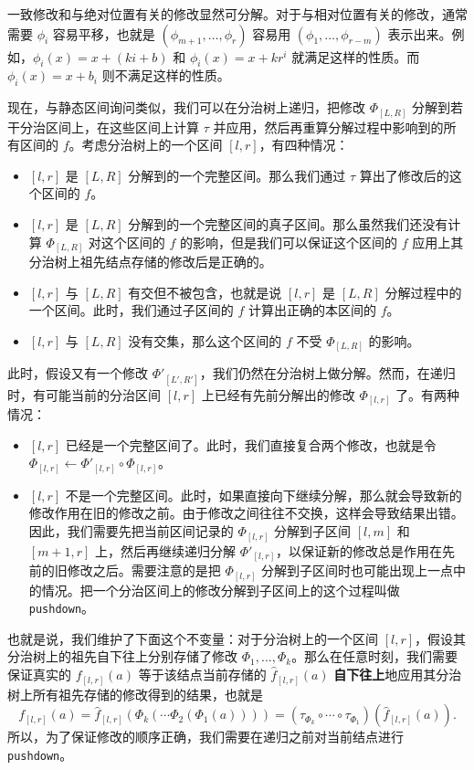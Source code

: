 \begin{example}
    一致修改和与绝对位置有关的修改显然可分解。对于与相对位置有关的修改，通常需要 $\phi_i$ 容易平移，也就是 $(\phi_{m+1},\ldots,\phi_r)$ 容易用 $(\phi_1,\ldots,\phi_{r-m})$ 表示出来。例如，$\phi_i(x)=x+(ki+b)$ 和 $\phi_i(x)=x+kr^i$ 就满足这样的性质。而 $\phi_i(x)=x+b_i$ 则不满足这样的性质。
\end{example}

现在，与静态区间询问类似，我们可以在分治树上递归，把修改 $\Phi_{[L,R]}$ 分解到若干分治区间上，在这些区间上计算 $\tau$ 并应用，然后再重算分解过程中影响到的所有区间的 $f$。考虑分治树上的一个区间 $[l,r]$，有四种情况：
\begin{itemize}
    \item $[l,r]$ 是 $[L,R]$ 分解到的一个完整区间。那么我们通过 $\tau$ 算出了修改后的这个区间的 $f$。
    \item $[l,r]$ 是 $[L,R]$ 分解到的一个完整区间的真子区间。那么虽然我们还没有计算 $\Phi_{[L,R]}$ 对这个区间的 $f$ 的影响，但是我们可以保证这个区间的 $f$ 应用上其分治树上祖先结点存储的修改后是正确的。
    \item $[l,r]$ 与 $[L,R]$ 有交但不被包含，也就是说 $[l,r]$ 是 $[L,R]$ 分解过程中的一个区间。此时，我们通过子区间的 $f$ 计算出正确的本区间的 $f$。
    \item $[l,r]$ 与 $[L,R]$ 没有交集，那么这个区间的 $f$ 不受 $\Phi_{[L,R]}$ 的影响。
\end{itemize}

此时，假设又有一个修改 $\Phi'_{[L',R']}$，我们仍然在分治树上做分解。然而，在递归时，有可能当前的分治区间 $[l,r]$ 上已经有先前分解出的修改 $\Phi_{[l,r]}$ 了。有两种情况：
\begin{itemize}
    \item $[l,r]$ 已经是一个完整区间了。此时，我们直接复合两个修改，也就是令 $\Phi_{[l,r]}\gets \Phi'_{[l,r]}\circ \Phi_{[l,r]}$。
    \item $[l,r]$ 不是一个完整区间。此时，如果直接向下继续分解，那么就会导致新的修改作用在旧的修改之前。由于修改之间往往不交换，这样会导致结果出错。因此，我们需要先把当前区间记录的 $\Phi_{[l,r]}$ 分解到子区间 $[l,m]$ 和 $[m+1,r]$ 上，然后再继续递归分解 $\Phi'_{[l,r]}$，以保证新的修改总是作用在先前的旧修改之后。需要注意的是把 $\Phi_{[l,r]}$ 分解到子区间时也可能出现上一点中的情况。把一个分治区间上的修改分解到子区间上的这个过程叫做 \texttt{pushdown}。
\end{itemize}

也就是说，我们维护了下面这个不变量：对于分治树上的一个区间 $[l,r]$，假设其分治树上的祖先自下往上分别存储了修改 $\Phi_1,\ldots,\Phi_k$。那么在任意时刻，我们需要保证真实的 $f_{[l,r]}(a)$ 等于该结点当前存储的 $\hat f_{[l,r]}(a)$ \textbf{自下往上}地应用其分治树上所有祖先存储的修改得到的结果，也就是
$$
f_{[l,r]}(a)=\hat f_{[l,r]}(\Phi_k(\cdots\Phi_2(\Phi_1(a))))=(\tau_{\Phi_k}\circ\cdots\circ \tau_{\Phi_1})(\hat f_{[l,r]}(a)).
$$
所以，为了保证修改的顺序正确，我们需要在递归之前对当前结点进行 \texttt{pushdown}。

